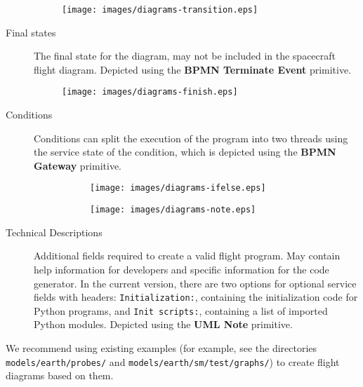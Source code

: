 \documentclass[12pt,a4paper]{article}
\begin{document}
\begin{description}
\begin{figure}[h]
  \begin{center}
    \texttt{[image: images/diagrams-transition.eps]}
  \end{center}
\end{figure}

\item[Final states] The final state for the diagram, may not be included in the spacecraft flight diagram. Depicted using the \textbf{BPMN
    Terminate Event} primitive.

\begin{figure}[h]
  \begin{center}
    \texttt{[image: images/diagrams-finish.eps]}
  \end{center}
\end{figure}

\item[Conditions] Conditions can split the execution of the program into two threads using the service state of the condition, which is depicted using the \textbf{BPMN Gateway} primitive.

\begin{figure}[h]
  \begin{center}
    \begin{subfigure}{0.4\textwidth}
      \texttt{[image: images/diagrams-ifelse.eps]}
    \end{subfigure}
    \hfill
    \begin{subfigure}{0.4\textwidth}
      \texttt{[image: images/diagrams-note.eps]}
    \end{subfigure}
  \end{center}
\end{figure}

\item[Technical Descriptions] Additional fields required to create a valid flight program. May contain help information for developers and specific information for the code generator. In the current version, there are two options for optional service fields with headers: \verb'Initialization:', containing the initialization code for Python programs, and \verb'Init scripts:', containing a list of imported Python modules. Depicted using the \textbf{UML Note} primitive.

\end{description}

We recommend using existing examples (for example, see the directories
\verb'models/earth/probes/' and \verb'models/earth/sm/test/graphs/') to create flight diagrams based on them.
\end{document}
